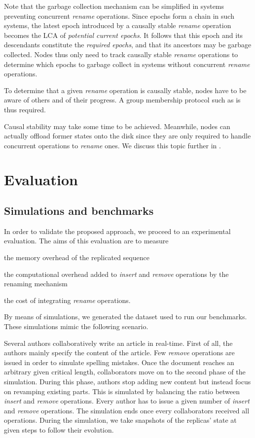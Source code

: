 \documentclass[10pt,journal,compsoc]{IEEEtran}
\begin{document}
Note that the garbage collection mechanism can be simplified in systems preventing concurrent \emph{rename} operations.
Since epochs form a chain in such systems, the latest epoch introduced by a causally stable \emph{rename} operation becomes the \ac{LCA} of \emph{potential current epochs}.
It follows that this epoch and its descendants constitute the \emph{required epochs}, and that its ancestors may be garbage collected.
Nodes thus only need to track causally stable \emph{rename} operations to determine which epochs to garbage collect in systems without concurrent \emph{rename} operations.

To determine that a given \emph{rename} operation is causally stable, nodes have to be aware of others and of their progress.
A group membership protocol such as \cite{swim2002,lifeguard2018} is thus required.

Causal stability may take some time to be achieved.
Meanwhile, nodes can actually offload former states onto the disk since they are only required to handle concurrent operations to \emph{rename} ones.
We discuss this topic further in .

\section{Evaluation}

\label{sec:evaluation}

\subsection{Simulations and benchmarks}

In order to validate the proposed approach, we proceed to an experimental evaluation.
The aims of this evaluation are to measure
\begin{enumerate*}[label=(\roman*)]
    \item the memory overhead of the replicated sequence
    \item the computational overhead added to \emph{insert} and \emph{remove} operations by the renaming mechanism
    \item the cost of integrating \emph{rename} operations.
\end{enumerate*}

By means of simulations, we generated the dataset used to run our benchmarks.
These simulations mimic the following scenario.

Several authors collaboratively write an article in real-time.
First of all, the authors mainly specify the content of the article.
Few \emph{remove} operations are issued in order to simulate spelling mistakes.
Once the document reaches an arbitrary given critical length, collaborators move on to the second phase of the simulation.
During this phase, authors stop adding new content but instead focus on revamping existing parts.
This is simulated by balancing the ratio between \emph{insert} and \emph{remove} operations.
Every author has to issue a given number of \emph{insert} and \emph{remove} operations.
The simulation ends once every collaborators received all operations.
During the simulation, we take snapshots of the replicas' state at given steps to follow their evolution.
\end{document}
